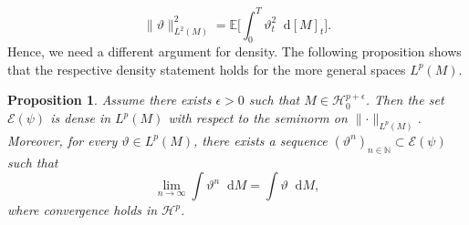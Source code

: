 \documentclass[11pt,a4paper,twoside,openany]{report}
\newcommand{\diff}{\mathop{}\!\mathrm{d}}
\theoremstyle{plain} %
\newtheorem{proposition}[proposition]{Proposition}
\theoremstyle{definition} %
\theoremstyle{remark} %
\begin{document}
\begin{equation}
    \lVert \vartheta\rVert_{L^2(M)}^2=\mathbb{E}\bigg[\int_0^T \vartheta_t^2\diff [M]_t\bigg].
\end{equation}
Hence, we need a different argument for density. The following proposition shows that the respective density statement holds for the more general spaces \(L^p(M)\).
\begin{proposition}\label{prop:Lp(M) density of E(psi)}
    Assume there exists \(\epsilon>0\) such that \(M\in\mathcal{H}_0^{p+\epsilon}\). Then the set \(\mathcal{E}(\psi)\) is dense in \(L^p(M)\) with respect to the seminorm on \(\lVert\cdot\rVert_{L^p(M)}\). Moreover, for every \(\vartheta\in L^p(M)\), there exists a sequence \((\vartheta^n)_{n\in\mathbb{N}}\subset\mathcal{E}(\psi)\) such that
    \begin{equation}
        \lim_{n\to\infty}\int \vartheta^n\diff M=\int \vartheta\diff M,
    \end{equation}
    where convergence holds in \(\mathcal{H}^p\). 
\end{proposition}
\end{document}
